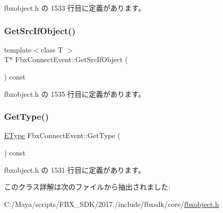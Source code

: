  fbxobject.\+h の 1533 行目に定義があります。

\mbox{\label{class_fbx_connect_event_a053adb5f16ff6d0e94e0511506070a38}} 
\subsubsection{\texorpdfstring{Get\+Src\+If\+Object()}{GetSrcIfObject()}}
{\footnotesize\ttfamily template$<$class T $>$ \\
T$\ast$ Fbx\+Connect\+Event\+::\+Get\+Src\+If\+Object (\begin{DoxyParamCaption}{ }\end{DoxyParamCaption}) const\hspace{0.3cm}{\ttfamily [inline]}}



 fbxobject.\+h の 1535 行目に定義があります。

\mbox{\label{class_fbx_connect_event_ac49976c7e8383896a63ff1e582e0ee2b}} 
\subsubsection{\texorpdfstring{Get\+Type()}{GetType()}}
{\footnotesize\ttfamily \hyperlink{class_fbx_connect_event_aa5471711f7e440a5a236ed06b08bf1d7}{E\+Type} Fbx\+Connect\+Event\+::\+Get\+Type (\begin{DoxyParamCaption}{ }\end{DoxyParamCaption}) const\hspace{0.3cm}{\ttfamily [inline]}}



 fbxobject.\+h の 1531 行目に定義があります。



このクラス詳解は次のファイルから抽出されました\+:\begin{DoxyCompactItemize}
\item 
C\+:/\+Maya/scripts/\+F\+B\+X\+\_\+\+S\+D\+K/2017./include/fbxsdk/core/\hyperlink{fbxobject_8h}{fbxobject.\+h}\end{DoxyCompactItemize}

